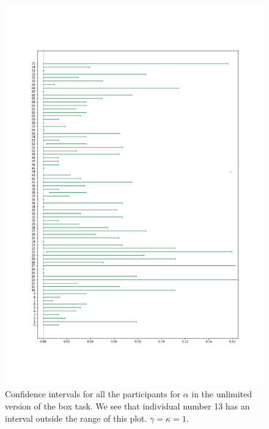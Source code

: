 \begin{figure}
    \centering
    \includegraphics[scale=0.37]{pictures/all_cis_unlim_alpha.png}
    \caption[CIs for $\alpha$, unlimited. $\gamma=\kappa=1$]{Confidence intervals for all the participants for $\alpha$ in the unlimited version of the box task. We see that individual number 13 has an interval outside the range of this plot. $\gamma=\kappa=1$.}
    \label{fig:all_cis_alpha_unlim_v2}
\end{figure}



